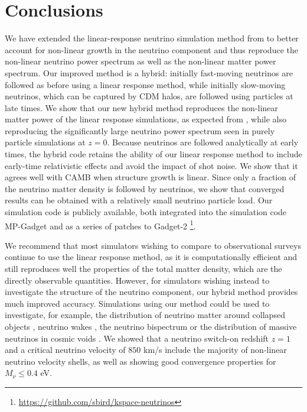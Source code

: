 \documentclass[useAMS, usenatbib]{mnras}
\begin{document}
\section{Conclusions}
\label{sec:conclusion}

We have extended the linear-response neutrino simulation method from \cite{AHB} to better account for non-linear growth in the neutrino component and thus reproduce the non-linear neutrino power spectrum as well as the non-linear matter power spectrum.
Our improved method is a hybrid: initially fast-moving neutrinos are followed as before using a linear response method, while initially slow-moving neutrinos, which can be captured by CDM halos, are followed using particles at late times. We show that our new hybrid method reproduces the non-linear matter power of the linear response simulations, as expected from \cite{AHB}, while also reproducing the significantly large neutrino power spectrum seen in purely particle simulations at $z=0$. Because neutrinos are followed analytically at early times, the hybrid code retains the ability of our linear response method to include early-time relativistic effects and avoid the impact of shot noise. We show that it agrees well with CAMB when structure growth is linear. Since only a fraction of the neutrino matter density is followed by neutrinos, we show that converged results can be obtained with a relatively small neutrino particle load. Our simulation code is publicly available, both integrated into the simulation code MP-Gadget and as a series of patches to Gadget-2 \footnote{\url{https://github.com/sbird/kspace-neutrinos}}.

We recommend that most simulators wishing to compare to observational surveys continue to use the linear response method, as it is computationally efficient and still reproduces well the properties of the total matter density, which are the directly observable quantities. However, for simulators wishing instead to investigate the structure of the neutrino component, our hybrid method provides much improved accuracy. Simulations using our method could be used to investigate, for example, the distribution of neutrino matter around collapsed objects \citep{FVN_2013}, neutrino wakes \citep{Inman_2015}, the neutrino bispectrum \citep{Furhrer_2015} or the distribution of massive neutrinos in cosmic voids \citep{Banerjee_2016}. We showed that a neutrino switch-on redshift $z=1$ and a critical neutrino velocity of $850$ km/s include the majority of non-linear neutrino velocity shells, as well as showing good convergence properties for $M_\nu \leq 0.4$ eV.
\end{document}
